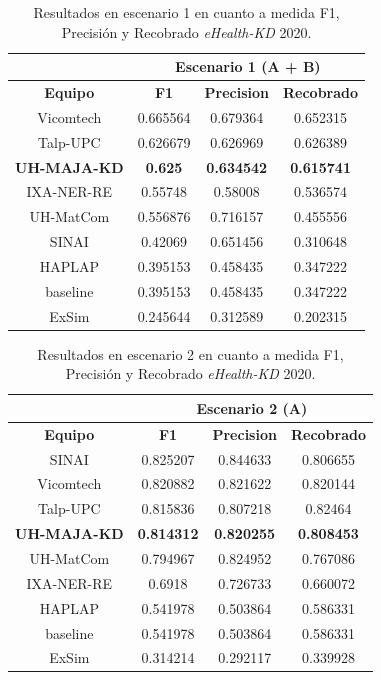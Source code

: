 \begin{table}[tb!]\centering
	\caption{Resultados en escenario 1 en cuanto a medida F1, Precisi\'on y Recobrado \textit{eHealth-KD} 2020. \label{table:results_20_escenario1}}
	\begin{tabular}{|c|c|c|c|}
		\hline
		&  \multicolumn{3}{c|}{\textbf{Escenario 1 (A + B)}} \\
		\hline
		\textbf{Equipo} & \textbf{F1} & \textbf{Precision} & \textbf{Recobrado} \\
		\hline
		Vicomtech & 0.665564 & 0.679364 & 0.652315  \\
		Talp-UPC & 0.626679 & 0.626969 & 0.626389 \\
		\textbf{UH-MAJA-KD} & \textbf{0.625} & \textbf{0.634542} & \textbf{0.615741} \\
		IXA-NER-RE & 0.55748 & 0.58008 & 0.536574 \\
		UH-MatCom & 0.556876 & 0.716157 & 0.455556 \\
		SINAI & 0.42069 & 0.651456 & 0.310648 \\
		HAPLAP & 0.395153 & 0.458435 & 0.347222 \\
		baseline & 0.395153 & 0.458435 & 0.347222 \\
		ExSim & 0.245644 & 0.312589 & 0.202315 \\	
		\hline
	\end{tabular}
\end{table}


\begin{table}[tb!]\centering
	\caption{Resultados en escenario 2 en cuanto a medida F1, Precisi\'on y Recobrado \textit{eHealth-KD} 2020. \label{table:results_20_escenario2}}
	\begin{tabular}{|c|c|c|c|}
		\hline
		&  \multicolumn{3}{c|}{\textbf{Escenario 2 (A)}} \\
		\hline
		\textbf{Equipo} & \textbf{F1} & \textbf{Precision} & \textbf{Recobrado} \\
		\hline
		SINAI & 0.825207 & 0.844633 & 0.806655 \\
		Vicomtech & 0.820882 & 0.821622 & 0.820144 \\
		Talp-UPC & 0.815836 & 0.807218 & 0.82464 \\
		\textbf{UH-MAJA-KD} & \textbf{0.814312} & \textbf{0.820255} & \textbf{0.808453} \\
		UH-MatCom & 0.794967 & 0.824952 & 0.767086 \\
		IXA-NER-RE & 0.6918 & 0.726733 & 0.660072 \\
		HAPLAP & 0.541978 & 0.503864 & 0.586331 \\
		baseline & 0.541978 & 0.503864 & 0.586331 \\
		ExSim & 0.314214 & 0.292117 & 0.339928 \\	
		\hline
	\end{tabular}
\end{table}

